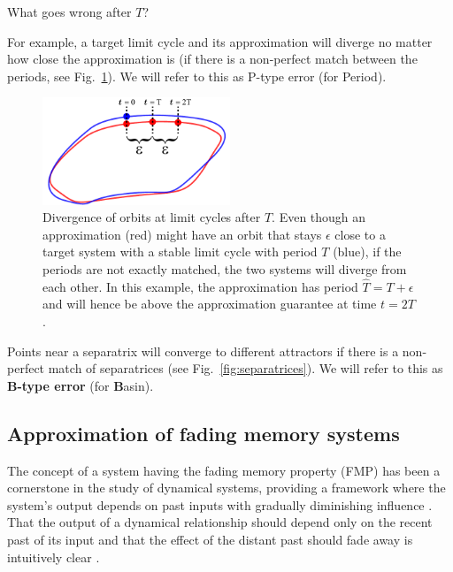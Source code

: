 \documentclass{article}
\theoremstyle{definition}
\theoremstyle{remark}
\newcounter{ct}
\begin{document}
What goes wrong after $T$?

For example, a target limit cycle and its approximation will diverge no matter how close the approximation is (if there is a non-perfect match between the periods, see Fig.~\ref{fig:lc_period_div}).
We will refer to this as P-type error (for Period).

\setlength\belowcaptionskip{-5ex}
\begin{figure}
  \centering
  \includegraphics[width=0.5\textwidth]{lc_period_div}
  \caption{Divergence of orbits at limit cycles after $T$.
  Even though an approximation (red) might have an orbit that stays $\epsilon$ close to a target system with a stable limit cycle with period $T$ (blue), if the periods are not exactly matched, the two systems will diverge from each other.
  In this example, the approximation has period $\hat{T} = T+\epsilon$ and will hence be above the approximation guarantee at time $t=2T$.
  }\label{fig:lc_period_div}
\end{figure}

Points near a separatrix will converge to different attractors if there is a non-perfect match of separatrices (see Fig.~\ref{fig:separatrices}).
We will refer to this as \textbf{B-type error} (for \textbf{B}asin).



\subsection{Approximation of fading memory systems}\label{sec:fadingmemory}
The concept of a system having the fading memory property (FMP) has been a cornerstone in the study of dynamical systems\citep{coleman1968general}, providing a framework where the system’s output depends on past inputs with gradually diminishing influence \citep{boyd1985fading}.
That the output of a dynamical relationship should depend only on the recent past of its input and that the effect of the distant past should fade away is intuitively clear  \citep{sepulchre2021fading}.
\end{document}
